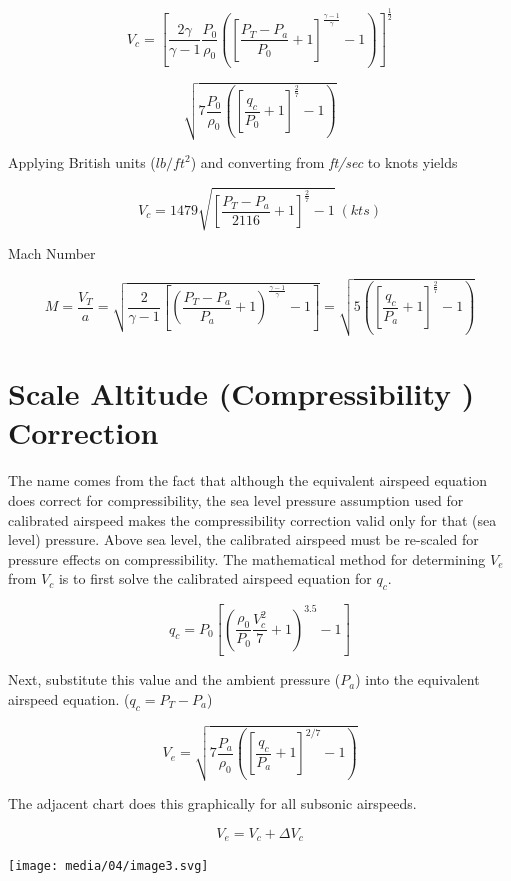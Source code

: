 \documentclass[
]{book}
\begin{document}
\[V_{c} = \left\lbrack \frac{2\gamma}{\gamma - 1}\frac{P_0}{\rho_0}\left( \left\lbrack \frac{P_{T} - P_{a}}{P_0} + 1 \right\rbrack^{\frac{\gamma - 1}{\gamma}} - 1 \right) \right\rbrack^{\frac{1}{2}}\]

\[\sqrt{7 \frac{P_0}{\rho_0}\left( \left\lbrack \frac{q_c}{P_0} + 1 \right\rbrack^{\frac{2}{7}} - 1 \right)}\]

Applying British units (\(lb/ft^2\)) and converting from \emph{ft/sec} to knots yields

\[ V_{c} = 1479\sqrt{\left\lbrack \frac{P_{T} - P_{a}}{2116} + 1 \right\rbrack^{\frac{2}{7}} - 1} ~(kts)\]

Mach Number

\[M = \frac{V_{T}}{a} = \sqrt{\frac{2}{\gamma - 1}\left\lbrack \left( \frac{P_{T} - P_{a}}{P_{a}} + 1 \right)^{\frac{\gamma - 1}{\gamma}} - 1 \right\rbrack} = \sqrt{5\left( \left\lbrack \frac{q_{c}}{P_{a}} + 1 \right\rbrack^{\frac{2}{7}} - 1 \right)}\]

\hypertarget{scale-altitude-compressibility-correction}{%
\section{Scale Altitude (Compressibility ) Correction}\label{scale-altitude-compressibility-correction}}

The name comes from the fact that although the equivalent airspeed equation does correct for compressibility, the sea level pressure assumption used for calibrated airspeed makes the compressibility correction valid only for that (sea level) pressure. Above sea level, the calibrated airspeed must be re-scaled for pressure effects on compressibility. The mathematical method for determining \(V_e\) from \(V_c\) is to first solve the calibrated airspeed equation for \(q_c\).

\[q_c = P_0  \left\lbrack \left( \frac{\rho_0}{P_0} \frac{V_c^2}{7} + 1 \right)^{3.5} - 1 \right\rbrack\]

Next, substitute this value and the ambient pressure (\(P_a\)) into the equivalent airspeed equation. (\(q_c = P_T - P_a\))

\[V_e = \sqrt{7 \frac{P_a}{\rho_0} \left( \left\lbrack \frac{q_c}{P_a}+1 \right\rbrack^{2/7} - 1 \right) } \]

The adjacent chart does this graphically for all subsonic airspeeds.

\[V_e = V_c + \Delta V_c\]

\texttt{[image: media/04/image3.svg]}
\end{document}
